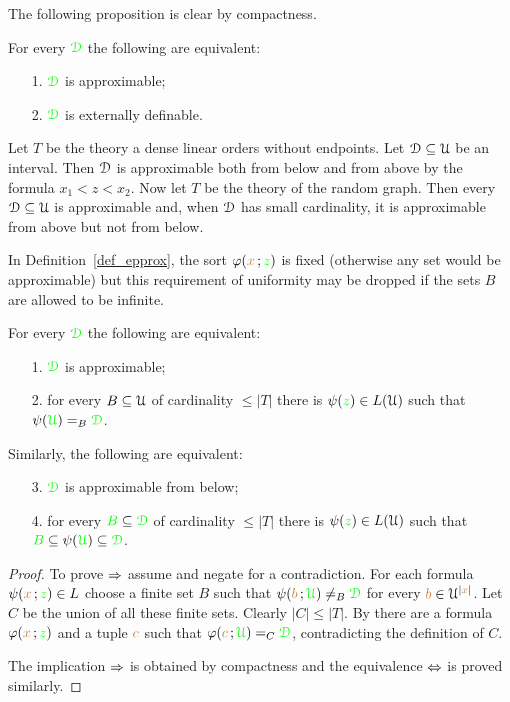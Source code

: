 \documentclass[creche.tex]{subfiles}
\begin{document}
The following proposition is clear by compactness.

\begin{proposition}\label{lem_approx=external}
For every ${\color{green}\EuScript D}$ the following are equivalent:
\begin{itemize}
\item[1.] ${\color{green}\EuScript D}$ is approximable;
\item[2.] ${\color{green}\EuScript D}$ is externally definable.\QED 
\end{itemize}
\end{proposition}

\begin{example}
Let $T$ be the theory a dense linear orders without endpoints. Let $\EuScript D\subseteq\EuScript U$ be an interval. Then $\EuScript D$ is approximable both from below and from above by the formula \mbox{$x_1<z<x_2$}.  Now let $T$ be the theory of the random graph. Then every $\EuScript D\subseteq\EuScript U$ is approximable and, when $\EuScript D$ has small cardinality, it is approximable from above but not from below.\QED
\end{example}

In Definition~\ref{def_epprox}, the sort $\varphi({\color{brown} x}\,;{\color{green} z})$ is fixed (otherwise any set would be approximable) but this requirement of uniformity may be dropped if the sets $B$ are allowed to be infinite.

\begin{proposition}\label{lem_approx_nonunif}
For every ${\color{green}\EuScript D}$ the following are equivalent:
\begin{itemize}
\item[1.] ${\color{green}\EuScript D}$ is approximable;
\item[2.] for every $B\subseteq\EuScript U$ of cardinality $\le|T|$ there is $\psi({\color{green} z})\in L(\EuScript U)$ such that $\psi({\color{green}\EuScript U})=_B{\color{green}\EuScript D}$.
\end{itemize}
Similarly, the following are equivalent:
\begin{itemize}
\item[3.] ${\color{green}\EuScript D}$ is approximable from below;
\item[4.]  for every ${\color{green} B}\subseteq{\color{green}\EuScript D}$ of cardinality $\le|T|$ there is $\psi({\color{green} z})\in L(\EuScript U)$ such that ${\color{green} B}\subseteq \psi({\color{green}\EuScript U})\subseteq{\color{green}\EuScript D}$.
\end{itemize}
\end{proposition}

\begin{proof}
To prove $\Rightarrow$ assume  and negate  for a contradiction. For each formula $\psi({\color{brown} x}\,;{\color{green} z})\in L$ choose a finite set $B$ such that $\psi({\color{brown} b}\,;{\color{green}\EuScript U})\neq_B{\color{green}\EuScript D}$ for every ${\color{brown} b}\in\EuScript U^{|{\color{brown} x}|}$. Let $C$ be the union of all these finite sets. Clearly $|C|\le|T|$.  By  there are a formula $\varphi({\color{brown} x}\,;{\color{green} z})$ and a tuple ${\color{brown} c}$ such that $\varphi({\color{brown} c}\,;{\color{green}\EuScript U})=_C{\color{green}\EuScript D}$, contradicting the definition of $C$.

The implication $\Rightarrow$ is obtained by compactness and the equivalence $\Leftrightarrow$ is proved similarly. 
\end{proof}
\end{document}
